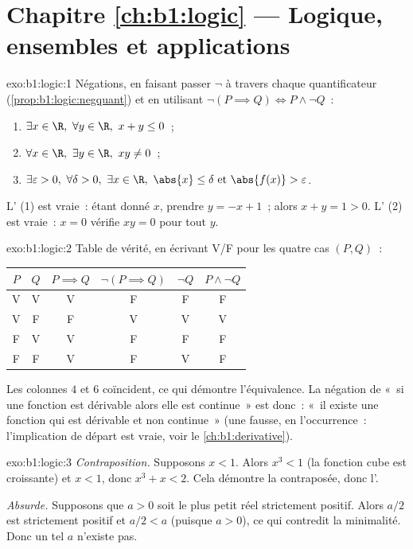 \section*{Chapitre \ref{ch:b1:logic} --- Logique, ensembles et applications}

\begin{solution}{exo:b1:logic:1}
Négations, en faisant passer $\lnot$ à travers chaque quantificateur
(\cref{prop:b1:logic:negquant}) et en utilisant $\lnot(P \implies Q)
\iff P \land \lnot Q$~:
\begin{enumerate}
  \item $\exists x \in \R,\ \forall y \in \R,\ x + y \leq 0$~;
  \item $\forall x \in \R,\ \exists y \in \R,\ xy \neq 0$~;
  \item $\exists \varepsilon > 0,\ \forall \delta > 0,\ \exists x \in
        \R,\ \abs{x} \leq \delta \text{ et } \abs{f(x)} >
        \varepsilon$.
\end{enumerate}
L' (1) est vraie~: étant donné $x$, prendre $y = -x + 1$~;
alors $x + y = 1 > 0$. L' (2) est vraie~: $x = 0$ vérifie
$xy = 0$ pour tout $y$.
\end{solution}

\begin{solution}{exo:b1:logic:2}
Table de vérité, en écrivant V/F pour les quatre cas $(P, Q)$~:
\begin{center}
\begin{tabular}{cc|c|c|c|c}
$P$ & $Q$ & $P \implies Q$ & $\lnot(P \implies Q)$ & $\lnot Q$ &
$P \land \lnot Q$ \\
\hline
V & V & V & F & F & F \\
V & F & F & V & V & V \\
F & V & V & F & F & F \\
F & F & V & F & V & F \\
\end{tabular}
\end{center}
Les colonnes $4$ et $6$ coïncident, ce qui démontre l'équivalence. La
négation de «~si une fonction est dérivable alors elle est continue~»
est donc~: «~il existe une fonction qui est dérivable et non continue~»
(une  fausse, en l'occurrence~: l'implication de départ est
vraie, voir le \cref{ch:b1:derivative}).
\end{solution}

\begin{solution}{exo:b1:logic:3}
\emph{Contraposition.} Supposons $x < 1$. Alors $x^3 < 1$ (la fonction
cube est croissante) et $x < 1$, donc $x^3 + x < 2$. Cela démontre la
contraposée, donc l'.

\emph{Absurde.} Supposons que $a > 0$ soit le plus petit réel
strictement positif. Alors $a/2$ est strictement positif et $a/2 < a$
(puisque $a > 0$), ce qui contredit la minimalité. Donc un tel $a$
n'existe pas.
\end{solution}

